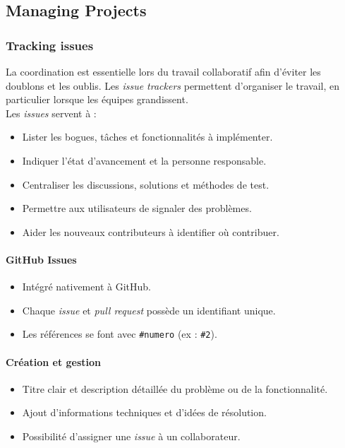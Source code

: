 \documentclass{article}
\begin{document}
\subsection{Managing Projects}

\subsubsection{Tracking issues}
La coordination est essentielle lors du travail collaboratif afin d’éviter les doublons et les oublis. Les \textit{issue trackers} permettent d’organiser le travail, en particulier lorsque les équipes grandissent.
\\
Les \textit{issues} servent à :
\begin{itemize}
    \item Lister les bogues, tâches et fonctionnalités à implémenter.
    \item Indiquer l’état d’avancement et la personne responsable.
    \item Centraliser les discussions, solutions et méthodes de test.
    \item Permettre aux utilisateurs de signaler des problèmes.
    \item Aider les nouveaux contributeurs à identifier où contribuer.
\end{itemize}
\paragraph{GitHub Issues}
\begin{itemize}
    \item Intégré nativement à GitHub.
    \item Chaque \textit{issue} et \textit{pull request} possède un identifiant unique.
    \item Les références se font avec \texttt{\#numero} (ex : \texttt{\#2}).
\end{itemize}

\paragraph{Création et gestion}
\begin{itemize}
    \item Titre clair et description détaillée du problème ou de la fonctionnalité.
    \item Ajout d’informations techniques et d’idées de résolution.
    \item Possibilité d’assigner une \textit{issue} à un collaborateur.
\end{itemize}
\end{document}
